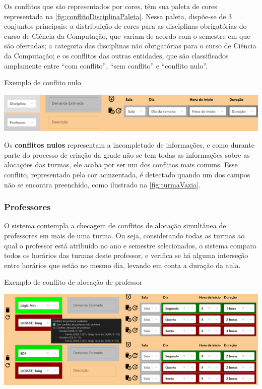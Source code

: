 Os conflitos que são representados por cores, têm sua paleta de cores representada na \autoref{fig:conflitoDisciplinaPaleta}. Nessa paleta, dispõe-se de 3 conjuntos principais: a distribuição de cores para as disciplinas obrigatórias do curso de Ciência da Computação, que variam de acordo com o semestre em que são ofertadas; a categoria das disciplinas não obrigatórias para o curso de Ciência da Computação; e os conflitos das outras entidades, que são classificados amplamente entre ``com conflito'', ``sem conflito'' e ``conflito nulo''.

\begin{MyCenteredFigure} \caption{Exemplo de conflito nulo} \label{fig:turmaVazia}
  \includegraphics[width=\textwidth]{files/img/2.02!5-desenvolvimento/2.02!5.1.5-conflitos/Incompletude de informações}
\end{MyCenteredFigure}

Os \textbf{conflitos nulos} representam a incompletude de informações, e como durante parte do processo de criação da grade não se tem todas as informações sobre as alocações das turmas, ele acaba por ser um dos conflitos mais comuns. Esse conflito, representado pela cor acinzentada, é detectado quando um dos campos não se encontra preenchido, como ilustrado na \autoref{fig:turmaVazia}.

\subsubsection{Professores} \label{sssec:Professores}

O sistema contempla a checagem de conflitos de alocação simultânea de professores em mais de uma turma. Ou seja, considerando todas as turmas ao qual o professor está atribuído no ano e semestre selecionados, o sistema compara todos os horários das turmas deste professor, e verifica se há alguma interseção entre horários que estão no mesmo dia, levando em conta a duração da aula.

\begin{MyCenteredFigure} \caption{Exemplo de conflito de alocação de professor} \label{fig:conflitoAlocacaoProfessor}
  \includegraphics[width=\textwidth]{files/img/2.02!5-desenvolvimento/2.02!5.1.5-conflitos/Alocação de professores}
\end{MyCenteredFigure}

